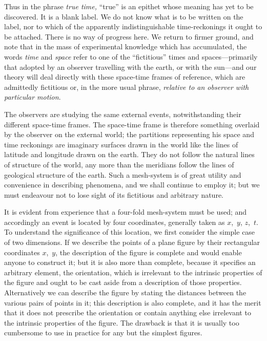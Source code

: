 \documentclass[12pt]{book}
\begin{document}
Thus in the phrase \emph{true time,} ``true'' is an epithet whose meaning has yet
to be discovered. It is a blank label. We do not know what is to be written
on the label, nor to which of the apparently indistinguishable time\hyp{}reckonings
it ought to be attached. There is no way of progress here. We return to
firmer ground, and note that in the mass of experimental knowledge which
has accumulated, the words \emph{time} and \emph{space} refer to one of the ``fictitious''
times and spaces---primarily that adopted by an observer travelling with the
earth, or with the sun---and our theory will deal directly with these space-time
frames of reference, which are admittedly fictitious or, in the more usual
phrase, \emph{relative to an observer with particular motion}.

The observers are studying the same external events, notwithstanding
their different space-time frames. The space-time frame is therefore something
overlaid by the observer on the external world; the partitions representing
his space and time reckonings are imaginary surfaces drawn in the
world like the lines of latitude and longitude drawn on the earth. They do
not follow the natural lines of structure of the world, any more than the
meridians follow the lines of geological structure of the earth. Such a mesh\hyp{}system
%
is of great utility and convenience in describing phenomena, and we
shall continue to employ it; but we must endeavour not to lose sight of its
fictitious and arbitrary nature.

It is evident from experience that a four-fold mesh\hyp{}system must be used;
and accordingly an event is located by four coordinates, generally taken as
%
$x$,~$y$, $z$,~$t$. To understand the significance of this location, we first consider
the simple case of two dimensions. If we describe the points of a plane figure
by their rectangular coordinates $x$,~$y$, the description of the figure is complete
and would enable anyone to construct it; but it is also more than complete,
because it specifies an arbitrary element, the orientation, which is irrelevant
to the intrinsic properties of the figure and ought to be cast aside from
a description of those properties. Alternatively we can describe the figure by
stating the distances between the various pairs of points in it; this description
is also complete, and it has the merit that it does not prescribe the
orientation or contain anything else irrelevant to the intrinsic properties of
the figure. The drawback is that it is usually too cumbersome to use in
practice for any but the simplest figures.
\end{document}
